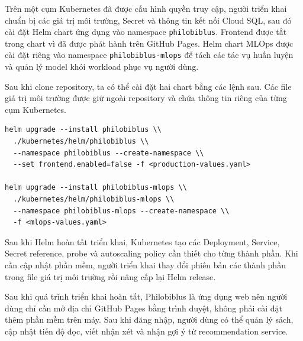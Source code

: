 Trên một cụm Kubernetes đã được cấu hình quyền truy cập, người triển khai chuẩn bị các giá trị môi trường, Secret và thông tin kết nối Cloud SQL, sau đó cài đặt Helm chart ứng dụng vào namespace \texttt{philobiblus}. Frontend được tắt trong chart vì đã được phát hành trên GitHub Pages. Helm chart MLOps được cài đặt riêng vào namespace \texttt{philobiblus-mlops} để tách các tác vụ huấn luyện và quản lý model khỏi workload phục vụ người dùng.

Sau khi clone repository, ta có thể cài đặt hai chart bằng các lệnh sau. Các file giá trị môi trường được giữ ngoài repository và chứa thông tin riêng của từng cụm Kubernetes.

\begin{verbatim}
helm upgrade --install philobiblus \\
  ./kubernetes/helm/philobiblus \\
  --namespace philobiblus --create-namespace \\
  --set frontend.enabled=false -f <production-values.yaml>

helm upgrade --install philobiblus-mlops \\
  ./kubernetes/helm/philobiblus-mlops \\
  --namespace philobiblus-mlops --create-namespace \\
  -f <mlops-values.yaml>
\end{verbatim}

Sau khi Helm hoàn tất triển khai, Kubernetes tạo các Deployment, Service, Secret reference, probe và autoscaling policy cần thiết cho từng thành phần. Khi cần cập nhật phần mềm, người triển khai thay đổi phiên bản các thành phần trong file giá trị môi trường rồi nâng cấp lại Helm release.

Sau khi quá trình triển khai hoàn tất, Philobiblus là ứng dụng web nên người dùng chỉ cần mở địa chỉ GitHub Pages bằng trình duyệt, không phải cài đặt thêm phần mềm trên máy. Sau khi đăng nhập, người dùng có thể quản lý sách, cập nhật tiến độ đọc, viết nhận xét và nhận gợi ý từ recommendation service.

